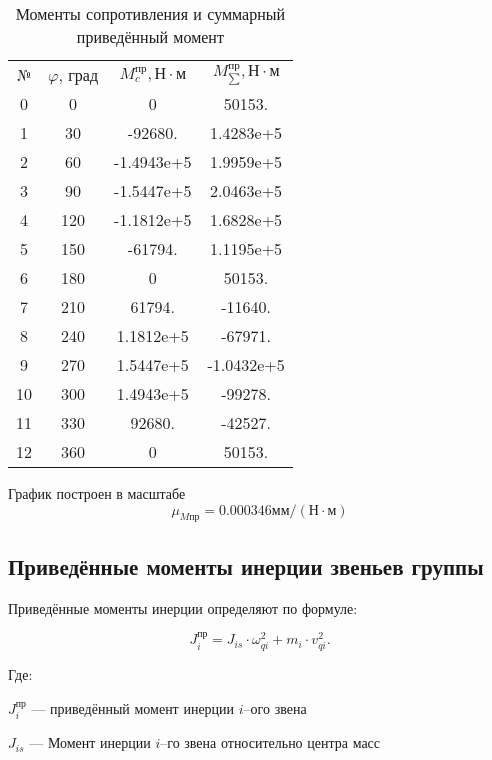 \begin{table}
\caption{Моменты сопротивления и суммарный приведённый момент}
\begin{tabular}{|c|c|c|c|}
	\hline 
	№& $\varphi$, град & $M_c^{пр}, Н \cdot м$ & $M_{\sum}^{пр}, Н \cdot м$ \\ 
	0  &    0 &           0 &      50153. \\
	\hline 
	1  &   30 &     -92680. &   1.4283e+5 \\
	\hline 
	2  &   60 &  -1.4943e+5 &   1.9959e+5 \\
	\hline 
	3  &   90 &  -1.5447e+5 &   2.0463e+5 \\
	\hline 
	4  &  120 &  -1.1812e+5 &   1.6828e+5 \\
	\hline 
	5  &  150 &     -61794. &   1.1195e+5 \\
	\hline 
	6  &  180 &           0 &      50153. \\
	\hline 
	7  &  210 &      61794. &     -11640. \\
	\hline 
	8  &  240 &   1.1812e+5 &     -67971. \\
	\hline 
	9  &  270 &   1.5447e+5 &  -1.0432e+5 \\
	\hline 
	10 &  300 &   1.4943e+5 &     -99278. \\
	\hline 
	11 &  330 &      92680. &     -42527. \\
	\hline 
	12 &  360 &           0 &      50153. \\
	\hline 
\end{tabular} 

\end{table}

График построен в масштабе $$ \mu_{Mпр} = 0.000346 мм/(Н \cdot м) $$

\subsection{Приведённые моменты инерции звеньев  группы}

Приведённые моменты инерции определяют по формуле:

\begin{equation}
	J_{i}^{пр} = J_{is} \cdot \omega_{qi}^2 + m_i \cdot v_{qi}^2.
\end{equation}

Где:

$ J_{i}^{пр} $ --- приведённый момент инерции $i$--ого звена

$ J_{is} $ --- Момент инерции $ i $--го звена относительно центра масс

